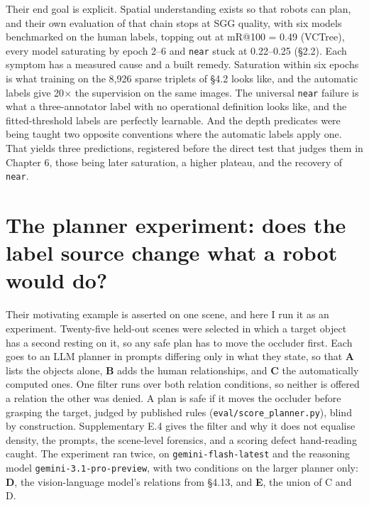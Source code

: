 Their end goal is explicit. Spatial understanding exists so that robots can plan, and their own evaluation of that chain stops at SGG quality, with six models benchmarked on the human labels, topping out at mR@100 = 0.49 (VCTree), every model saturating by epoch 2--6 and \texttt{near} stuck at 0.22--0.25 (\S{}2.2). Each symptom has a measured cause and a built remedy. Saturation within six epochs is what training on the 8,926 sparse triplets of \S{}4.2 looks like, and the automatic labels give 20$\times$ the supervision on the same images. The universal \texttt{near} failure is what a three-annotator label with no operational definition looks like, and the fitted-threshold labels are perfectly learnable. And the depth predicates were being taught two opposite conventions where the automatic labels apply one. That yields three predictions, registered before the direct test that judges them in Chapter 6, those being later saturation, a higher plateau, and the recovery of \texttt{near}.

\section{The planner experiment: does the label source change what a robot would do?}

Their motivating example is asserted on one scene, and here I run it as an experiment. Twenty-five held-out scenes were selected in which a target object has a second resting on it, so any safe plan has to move the occluder first. Each goes to an LLM planner in prompts differing only in what they state, so that \textbf{A} lists the objects alone, \textbf{B} adds the human relationships, and \textbf{C} the automatically computed ones. One filter runs over both relation conditions, so neither is offered a relation the other was denied. A plan is safe if it moves the occluder before grasping the target, judged by published rules (\texttt{eval/score\_\allowbreak{}planner.py}), blind by construction. Supplementary E.4 gives the filter and why it does not equalise density, the prompts, the scene-level forensics, and a scoring defect hand-reading caught. The experiment ran twice, on \texttt{gemini-flash-latest} and the reasoning model \texttt{gemini-3.1-pro-preview}, with two conditions on the larger planner only: \textbf{D}, the vision-language model's relations from \S{}4.13, and \textbf{E}, the union of C and D.

